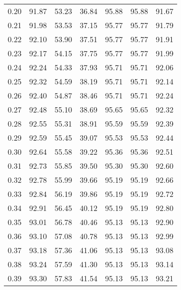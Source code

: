 \begin{tabular}{|c|c|c|c|c|c|c|}
      0.20 &     91.87 &     53.23 &      36.84 &   95.88 &      95.88 &         91.67 \\
      0.21 &     91.98 &     53.53 &      37.15 &   95.77 &      95.77 &         91.79 \\
      0.22 &     92.10 &     53.90 &      37.51 &   95.77 &      95.77 &         91.91 \\
      0.23 &     92.17 &     54.15 &      37.75 &   95.77 &      95.77 &         91.99 \\
      0.24 &     92.24 &     54.33 &      37.93 &   95.71 &      95.71 &         92.06 \\
      0.25 &     92.32 &     54.59 &      38.19 &   95.71 &      95.71 &         92.14 \\
      0.26 &     92.40 &     54.87 &      38.46 &   95.71 &      95.71 &         92.24 \\
      0.27 &     92.48 &     55.10 &      38.69 &   95.65 &      95.65 &         92.32 \\
      0.28 &     92.55 &     55.31 &      38.91 &   95.59 &      95.59 &         92.39 \\
      0.29 &     92.59 &     55.45 &      39.07 &   95.53 &      95.53 &         92.44 \\
      0.30 &     92.64 &     55.58 &      39.22 &   95.36 &      95.36 &         92.51 \\
      0.31 &     92.73 &     55.85 &      39.50 &   95.30 &      95.30 &         92.60 \\
      0.32 &     92.78 &     55.99 &      39.66 &   95.19 &      95.19 &         92.66 \\
      0.33 &     92.84 &     56.19 &      39.86 &   95.19 &      95.19 &         92.72 \\
      0.34 &     92.91 &     56.45 &      40.12 &   95.19 &      95.19 &         92.80 \\
      0.35 &     93.01 &     56.78 &      40.46 &   95.13 &      95.13 &         92.90 \\
      0.36 &     93.10 &     57.08 &      40.78 &   95.13 &      95.13 &         92.99 \\
      0.37 &     93.18 &     57.36 &      41.06 &   95.13 &      95.13 &         93.08 \\
      0.38 &     93.24 &     57.59 &      41.30 &   95.13 &      95.13 &         93.14 \\
      0.39 &     93.30 &     57.83 &      41.54 &   95.13 &      95.13 &         93.21 \\

\end{tabular}
